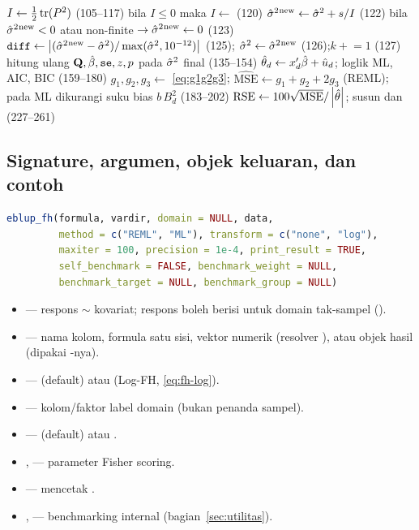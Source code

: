 \begin{algorithm}[htbp]
{{    $I\leftarrow\tfrac12\operatorname{tr}(P^2)$ (105--117)}\;
  bila $I\le0$ maka $I\leftarrow$  (120)\;
  ${\hat\sigma^2}{}^{\text{new}}\leftarrow\hat\sigma^2+s/I$ (122)\;
  bila ${\hat\sigma^2}{}^{\text{new}}<0$ atau non-finite $\to{\hat\sigma^2}{}^{\text{new}}\leftarrow0$ (123)\;
  $\texttt{diff}\leftarrow\left|({\hat\sigma^2}{}^{\text{new}}-\hat\sigma^2)/\max(\hat\sigma^2,10^{-12})\right|$ (125);\quad
    $\hat\sigma^2\leftarrow{\hat\sigma^2}{}^{\text{new}}$ (126);\quad $k\mathrel{+}=1$ (127)\;
}
hitung ulang $\mathbf{Q},\hat\beta,\texttt{se},z,p$ pada $\hat\sigma^2$ final (135--154)\;
$\hat\theta_d\leftarrow x_d'\hat\beta+\hat u_d$; loglik ML, AIC, BIC (159--180)\;
$g_1,g_2,g_3\leftarrow$ \eqref{eq:g1g2g3};
  $\widehat{\mathrm{MSE}}\leftarrow g_1+g_2+2g_3$ (REML);
  pada ML dikurangi suku bias $b\,B_d^2$ (183--202)\;
$\mathrm{RSE}\leftarrow100\sqrt{\mathrm{MSE}}/\left|\hat\theta\right|$;
  susun  dan  (227--261)\;
\end{algorithm}

\subsection{Signature, argumen, objek keluaran, dan contoh}\label{sec:fh-api}

\begin{lstlisting}[language=R,caption={Signature \texttt{eblup\_fh} (\texttt{R/eblup\_fh.R:98-112}).}]
eblup_fh(formula, vardir, domain = NULL, data,
         method = c("REML", "ML"), transform = c("none", "log"),
         maxiter = 100, precision = 1e-4, print_result = TRUE,
         self_benchmark = FALSE, benchmark_weight = NULL,
         benchmark_target = NULL, benchmark_group = NULL)
\end{lstlisting}

\begin{itemize}
  \item {} --- respons $\sim$ kovariat; respons boleh berisi
         untuk domain tak-sampel ().
  \item {} --- nama kolom, formula satu sisi, vektor numerik
        (resolver ), atau objek hasil
         (dipakai -nya).
  \item {} ---  (default) atau 
        (Log-FH, \eqref{eq:fh-log}).
  \item {} --- kolom/faktor label domain (bukan penanda sampel).
  \item {} ---  (default) atau .
  \item {},  --- parameter Fisher scoring.
  \item {} --- mencetak .
  \item {},  --- benchmarking internal
        (bagian~\ref{sec:utilitas}).
\end{itemize}

